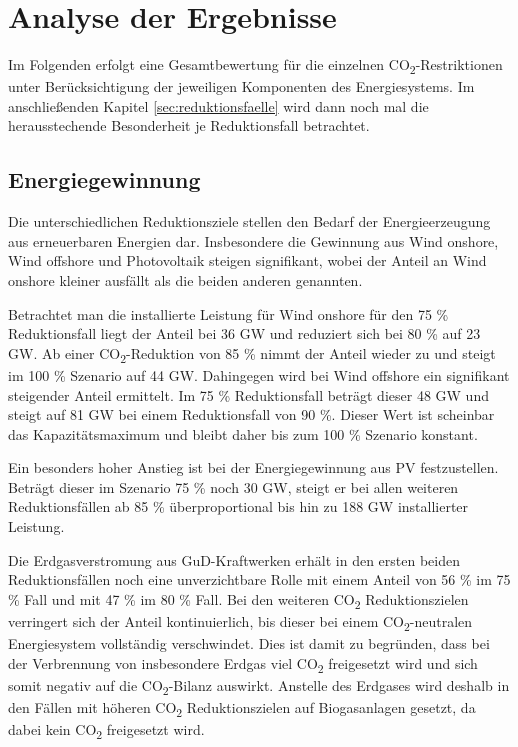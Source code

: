 \section{Analyse der Ergebnisse}
\label{sec:gesamtanalyse}

Im Folgenden erfolgt eine Gesamtbewertung für die einzelnen CO\textsubscript{2}-Restriktionen unter Berücksichtigung der jeweiligen Komponenten des Energiesystems. Im anschließenden Kapitel \ref{sec:reduktionsfaelle} wird dann noch mal die herausstechende Besonderheit je Reduktionsfall betrachtet. 

\subsection{Energiegewinnung}
Die unterschiedlichen Reduktionsziele stellen den Bedarf der Energieerzeugung aus erneuerbaren Energien dar. Insbesondere die Gewinnung aus Wind onshore, Wind offshore und Photovoltaik steigen signifikant, wobei der Anteil an Wind onshore kleiner ausfällt als die beiden anderen genannten. 

Betrachtet man die installierte Leistung für Wind onshore für den 75 \% Reduktionsfall liegt der Anteil bei 36 GW und reduziert sich bei 80 \% auf 23 GW. Ab einer CO\textsubscript{2}-Reduktion von 85 \% nimmt der Anteil wieder zu und steigt im 100 \% Szenario auf 44 GW. 
Dahingegen wird bei Wind offshore ein signifikant steigender Anteil ermittelt. Im 75 \% Reduktionsfall beträgt dieser 48 GW und steigt auf 81 GW bei einem Reduktionsfall von 90 \%. Dieser Wert ist scheinbar das Kapazitätsmaximum und bleibt daher bis zum 100 \% Szenario konstant.

Ein besonders hoher Anstieg ist bei der Energiegewinnung aus PV festzustellen. Beträgt dieser im Szenario 75 \% noch 30 GW, steigt er bei allen weiteren Reduktionsfällen ab 85 \% überproportional bis hin zu 188 GW installierter Leistung.


Die Erdgasverstromung aus GuD-Kraftwerken erhält in den ersten beiden Reduktionsfällen noch eine unverzichtbare Rolle mit einem Anteil von 56 \% im 75 \% Fall und mit 47 \% im 80 \% Fall. Bei den weiteren CO\textsubscript{2} Reduktionszielen verringert sich der Anteil kontinuierlich, bis dieser bei einem CO\textsubscript{2}-neutralen Energiesystem vollständig verschwindet. Dies ist damit zu begründen, dass bei der Verbrennung von insbesondere Erdgas viel CO\textsubscript{2} freigesetzt wird und sich somit negativ auf die CO\textsubscript{2}-Bilanz auswirkt. Anstelle des Erdgases wird deshalb in den Fällen mit höheren CO\textsubscript{2} Reduktionszielen auf Biogasanlagen gesetzt, da dabei kein CO\textsubscript{2} freigesetzt wird. 


